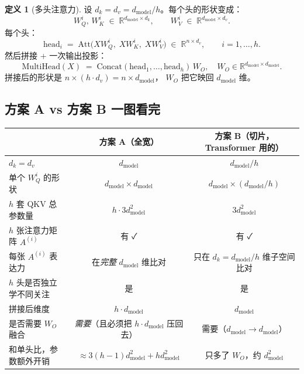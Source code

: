 \documentclass[11pt,a4paper]{ctexart}
\theoremstyle{definition}
\newtheorem{definitionx}{定义}
\theoremstyle{remark}
\newcommand{\R}{\mathbb{R}}
\newcommand{\Att}{\mathrm{Att}}
\newcommand{\MH}{\mathrm{MultiHead}}
\begin{document}
\begin{definitionx}[多头注意力]
设 $d_k = d_v = d_{\text{model}} / h$。每个头的形状变成：
\[
  W_Q^i,\, W_K^i \;\in\; \R^{d_{\text{model}} \times d_k},\qquad
  W_V^i \;\in\; \R^{d_{\text{model}} \times d_v}.
\]
每个头：
\[
  \mathrm{head}_i \;=\; \Att\big(X W_Q^i,\; X W_K^i,\; X W_V^i\big)
  \;\in\; \R^{n \times d_v}, \qquad i = 1, \dots, h.
\]
然后拼接 + 一次输出投影：
\[
  \boxed{\;
  \MH(X) \;=\; \mathrm{Concat}(\mathrm{head}_1, \dots, \mathrm{head}_h)\, W_O,
  \quad W_O \in \R^{d_{\text{model}} \times d_{\text{model}}}.
  \;}
\]
拼接后的形状是 $n \times (h\cdot d_v) = n \times d_{\text{model}}$，
$W_O$ 把它映回 $d_{\text{model}}$ 维。
\end{definitionx}

\subsection{方案 A vs 方案 B 一图看完}

\begin{center}
\renewcommand{\arraystretch}{1.35}
\begin{tabular}{@{}p{4.2cm} c c@{}}
\toprule
                                  & \textbf{方案 A（全宽）}              & \textbf{方案 B（切片，Transformer 用的）} \\
\midrule
$d_k = d_v$                       & $d_{\text{model}}$                  & $d_{\text{model}}/h$ \\
单个 $W_Q^i$ 的形状               & $d_{\text{model}} \times d_{\text{model}}$ & $d_{\text{model}} \times (d_{\text{model}}/h)$ \\
$h$ 套 QKV 总参数量                & $h \cdot 3 d_{\text{model}}^2$       & $3 d_{\text{model}}^2$ \\
$h$ 张注意力矩阵 $A^{(i)}$         & 有 ✓                                & 有 ✓ \\
每张 $A^{(i)}$ 表达力              & 在\emph{完整} $d_{\text{model}}$ 维比对  & 只在 $d_k = d_{\text{model}}/h$ 维子空间比对 \\
$h$ 头是否独立学不同关注           & 是                                  & 是 \\
拼接后维度                         & $h \cdot d_{\text{model}}$           & $d_{\text{model}}$ \\
是否需要 $W_O$ 融合                & \emph{需要}（且必须把 $h\cdot d_{\text{model}}$ 压回去） & 需要（$d_{\text{model}}\to d_{\text{model}}$） \\
和单头比，参数额外开销             & $\approx 3(h-1) d_{\text{model}}^2 + h d_{\text{model}}^2$ & 只多了 $W_O$，约 $d_{\text{model}}^2$ \\
\bottomrule
\end{tabular}
\end{center}
\end{document}
